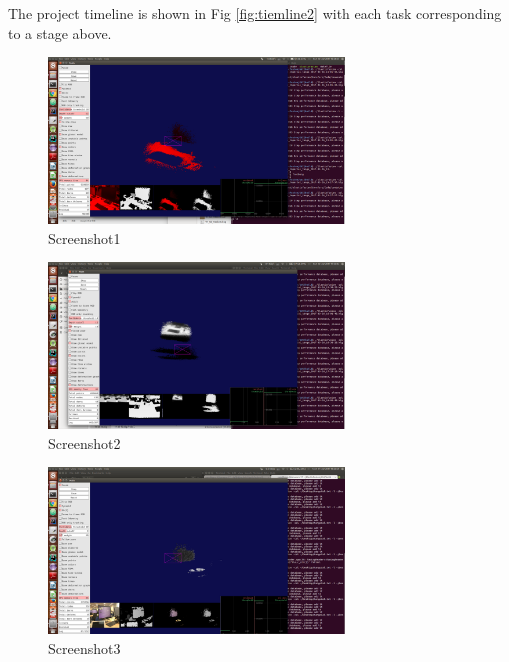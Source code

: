 \documentclass[12pt,twoside]{article}
\begin{document}
The project timeline is shown in Fig \ref{fig:tiemline2} with each task corresponding to a stage above.








\begin{figure}[h]
    \centering
    \includegraphics[width=0.7\textwidth]{figures/Screenshot1}
    \caption{Screenshot1}
    \label{fig:Screenshot1}
\end{figure}

\begin{figure}[h]
    \centering
    \includegraphics[width=0.7\textwidth]{figures/Screenshot2}
    \caption{Screenshot2}
    \label{fig:Screenshot2}
\end{figure}

\begin{figure}[h]
    \centering
    \includegraphics[width=0.7\textwidth]{figures/Screenshot3}
    \caption{Screenshot3}
    \label{fig:Screenshot3}
\end{figure}
\end{document}
